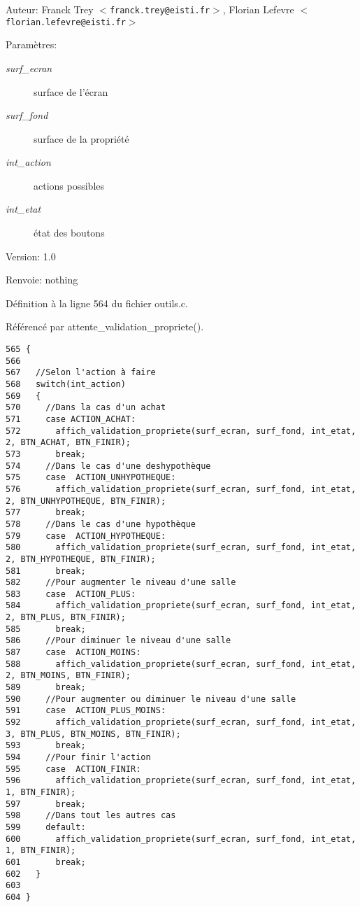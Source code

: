 \begin{Desc}
\item[Auteur:]Franck Trey $<${\tt franck.trey@eisti.fr}$>$, Florian Lefevre $<${\tt florian.lefevre@eisti.fr}$>$\end{Desc}
\begin{Desc}
\item[Param\`{e}tres:]
\begin{description}
\item[{\em surf\_\-ecran}]surface de l'\'{e}cran \item[{\em surf\_\-fond}]surface de la propri\'{e}t\'{e} \item[{\em int\_\-action}]actions possibles \item[{\em int\_\-etat}]\'{e}tat des boutons\end{description}
\end{Desc}
\begin{Desc}
\item[Version:]1.0 \end{Desc}
\begin{Desc}
\item[Renvoie:]nothing \end{Desc}


D\'{e}finition \`{a} la ligne 564 du fichier outils.c.

R\'{e}f\'{e}renc\'{e} par attente\_\-validation\_\-propriete().

\begin{Code}\begin{verbatim}565 {
566   
567   //Selon l'action à faire
568   switch(int_action)
569   {
570     //Dans la cas d'un achat
571     case ACTION_ACHAT:
572       affich_validation_propriete(surf_ecran, surf_fond, int_etat, 2, BTN_ACHAT, BTN_FINIR);
573       break;
574     //Dans le cas d'une deshypothèque
575     case  ACTION_UNHYPOTHEQUE:
576       affich_validation_propriete(surf_ecran, surf_fond, int_etat, 2, BTN_UNHYPOTHEQUE, BTN_FINIR);
577       break;
578     //Dans le cas d'une hypothèque
579     case  ACTION_HYPOTHEQUE:
580       affich_validation_propriete(surf_ecran, surf_fond, int_etat, 2, BTN_HYPOTHEQUE, BTN_FINIR);
581       break;
582     //Pour augmenter le niveau d'une salle
583     case  ACTION_PLUS:
584       affich_validation_propriete(surf_ecran, surf_fond, int_etat, 2, BTN_PLUS, BTN_FINIR);
585       break;
586     //Pour diminuer le niveau d'une salle
587     case  ACTION_MOINS:
588       affich_validation_propriete(surf_ecran, surf_fond, int_etat, 2, BTN_MOINS, BTN_FINIR);
589       break;
590     //Pour augmenter ou diminuer le niveau d'une salle
591     case  ACTION_PLUS_MOINS:
592       affich_validation_propriete(surf_ecran, surf_fond, int_etat, 3, BTN_PLUS, BTN_MOINS, BTN_FINIR);
593       break;
594     //Pour finir l'action
595     case  ACTION_FINIR:
596       affich_validation_propriete(surf_ecran, surf_fond, int_etat, 1, BTN_FINIR);
597       break;
598     //Dans tout les autres cas
599     default:
600       affich_validation_propriete(surf_ecran, surf_fond, int_etat, 1, BTN_FINIR);
601       break;
602   }
603   
604 }
\end{verbatim}\end{Code}


